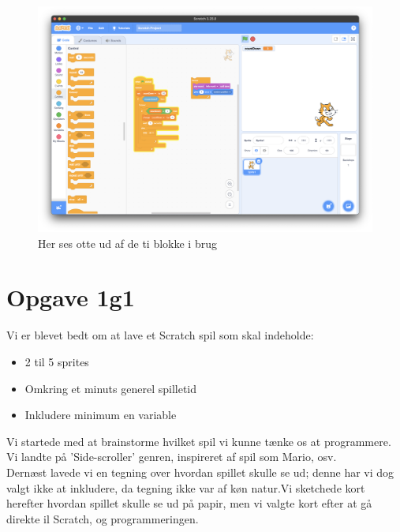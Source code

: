 \documentclass[12pt,a4paper]{article}
\begin{document}
\begin{figure}[h]
    \centering
    \includegraphics[width=\linewidth]{Evidence.png}
    \caption{Her ses otte ud af de ti blokke i brug}
    \label{fig:1}
\end{figure}
\pagebreak

\section{Opgave 1g1}
Vi er blevet bedt om at lave et Scratch spil som skal indeholde:
\begin{itemize}
    \item 2 til 5 sprites
    \item Omkring et minuts generel spilletid
    \item Inkludere minimum en variable
\end{itemize}
\noindent
Vi startede med at brainstorme hvilket spil vi kunne tænke os at programmere. Vi landte på 'Side-scroller' genren, inspireret af spil som Mario, osv.\\
\linebreak
Dernæst lavede vi en tegning over hvordan spillet skulle se ud; denne har vi dog valgt ikke at inkludere, da tegning ikke var af køn natur.Vi sketchede kort herefter hvordan spillet skulle se ud på papir, men vi valgte kort efter at gå direkte il Scratch, og programmeringen.
\end{document}
